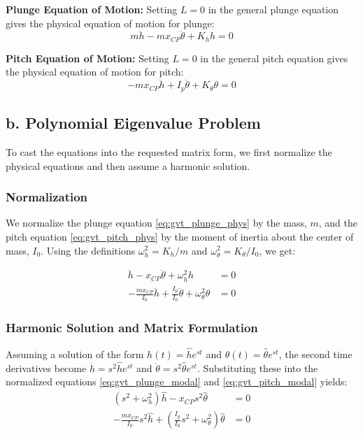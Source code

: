 \documentclass{article}
\begin{document}
\noindent\textbf{Plunge Equation of Motion:}
Setting $L=0$ in the general plunge equation gives the physical equation of motion for plunge:
\begin{equation}
    m \ddot{h} - m x_{CP} \ddot{\theta} + K_h h = 0
    \label{eq:gvt_plunge_phys}
\end{equation}

\noindent\textbf{Pitch Equation of Motion:}
Setting $L=0$ in the general pitch equation gives the physical equation of motion for pitch:
\begin{equation}
    - m x_{CP} \ddot{h} + I_p \ddot{\theta} + K_{\theta} \theta = 0
    \label{eq:gvt_pitch_phys}
\end{equation}

\subsection{b. Polynomial Eigenvalue Problem}
To cast the equations into the requested matrix form, we first normalize the physical equations and then assume a harmonic solution.

\subsubsection{Normalization}
We normalize the plunge equation \eqref{eq:gvt_plunge_phys} by the mass, $m$, and the pitch equation \eqref{eq:gvt_pitch_phys} by the moment of inertia about the center of mass, $I_0$. Using the definitions $\omega_h^2=K_h/m$ and $\omega_\theta^2=K_\theta/I_0$, we get:

\begin{align}
    \ddot{h} - x_{CP} \ddot{\theta} + \omega_h^2 h &= 0 \label{eq:gvt_plunge_modal} \\
    -\frac{m x_{CP}}{I_0} \ddot{h} + \frac{I_p}{I_0} \ddot{\theta} + \omega_\theta^2 \theta &= 0 \label{eq:gvt_pitch_modal}
\end{align}

\subsubsection{Harmonic Solution and Matrix Formulation}
Assuming a solution of the form $h(t) = \hat{h}e^{st}$ and $\theta(t) = \hat{\theta}e^{st}$, the second time derivatives become $\ddot{h} = s^2\hat{h}e^{st}$ and $\ddot{\theta} = s^2\hat{\theta}e^{st}$. Substituting these into the normalized equations \eqref{eq:gvt_plunge_modal} and \eqref{eq:gvt_pitch_modal} yields:
\begin{align*}
    (s^2 + \omega_h^2)\hat{h} - x_{CP}s^2\hat{\theta} &= 0 \\
    -\frac{m x_{CP}}{I_0}s^2\hat{h} + \left(\frac{I_p}{I_0}s^2 + \omega_\theta^2\right)\hat{\theta} &= 0
\end{align*}
\end{document}
